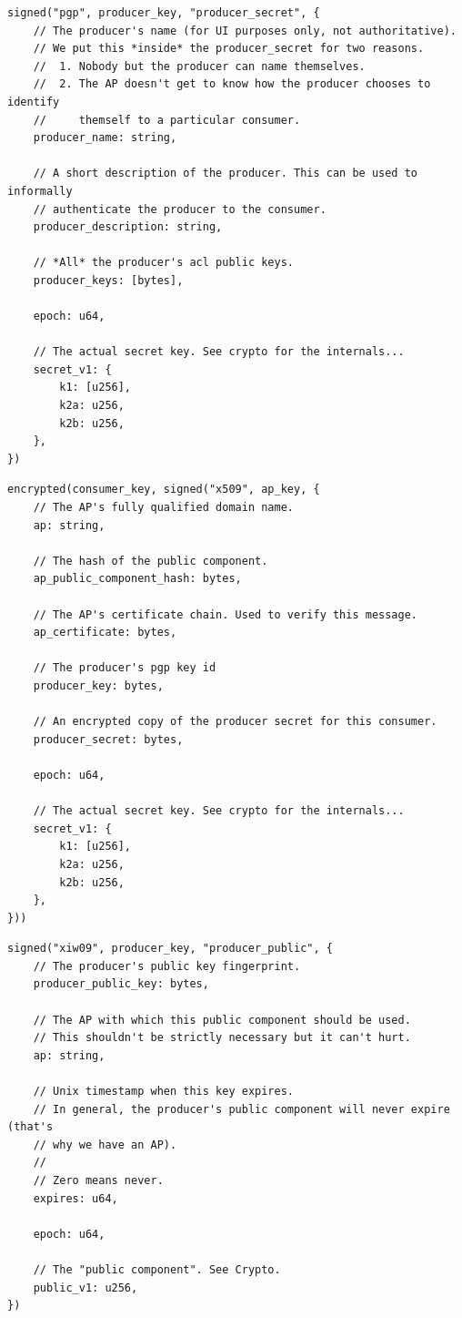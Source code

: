\documentclass[pdftex,12pt,a4papaer,twoside,notitlepage]{report}
\begin{document}
\begin{lstlisting}[caption={AP Secret Component},float,floatplacement=H]
signed("pgp", producer_key, "producer_secret", {     
    // The producer's name (for UI purposes only, not authoritative).
    // We put this *inside* the producer_secret for two reasons.
    //  1. Nobody but the producer can name themselves.
    //  2. The AP doesn't get to know how the producer chooses to identify
    //     themself to a particular consumer. 
    producer_name: string,
    
    // A short description of the producer. This can be used to informally
    // authenticate the producer to the consumer.
    producer_description: string,

    // *All* the producer's acl public keys.
    producer_keys: [bytes],

    epoch: u64,

    // The actual secret key. See crypto for the internals...
    secret_v1: {
        k1: [u256],
        k2a: u256,
        k2b: u256,
    },
})
\end{lstlisting}

\begin{lstlisting}[caption={AP Key Bundle},float,floatplacement=H]
encrypted(consumer_key, signed("x509", ap_key, {     
    // The AP's fully qualified domain name.
    ap: string,

    // The hash of the public component.
    ap_public_component_hash: bytes,

    // The AP's certificate chain. Used to verify this message.
    ap_certificate: bytes,

    // The producer's pgp key id
    producer_key: bytes,

    // An encrypted copy of the producer secret for this consumer.
    producer_secret: bytes,

    epoch: u64,

    // The actual secret key. See crypto for the internals...
    secret_v1: {
        k1: [u256],
        k2a: u256,
        k2b: u256,
    },
}))
\end{lstlisting}

\begin{lstlisting}[caption={Producer Public Component},float,floatplacement=H]
signed("xiw09", producer_key, "producer_public", {     
    // The producer's public key fingerprint.
    producer_public_key: bytes,

    // The AP with which this public component should be used.
    // This shouldn't be strictly necessary but it can't hurt.
    ap: string,

    // Unix timestamp when this key expires.
    // In general, the producer's public component will never expire (that's
    // why we have an AP).
    //
    // Zero means never.
    expires: u64,

    epoch: u64,

    // The "public component". See Crypto.
    public_v1: u256,
})
\end{lstlisting}
\end{document}
